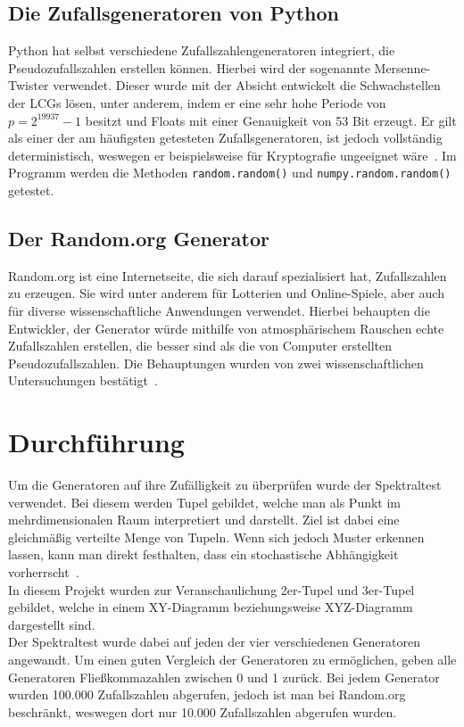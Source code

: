 \documentclass[12pt]{article}
\begin{document}
    \subsection{Die Zufallsgeneratoren von Python}\label{subsec:die-zufallsgeneratoren-von-python}
    Python hat selbst verschiedene Zufallszahlengeneratoren integriert, die Pseudozufallszahlen erstellen können.
    Hierbei wird der sogenannte Mersenne-Twister verwendet.
    Dieser wurde mit der Absicht entwickelt die Schwachstellen der LCGs lösen, unter anderem,
    indem er eine sehr hohe Periode von $p=2^{19937}-1$ besitzt und Floats mit einer Genauigkeit von 53 Bit erzeugt.
    Er gilt als einer der am häufigsten getesteten Zufallsgeneratoren, ist jedoch vollständig deterministisch,
    weswegen er beispielsweise für Kryptografie ungeeignet wäre~\cite{python-random,mersenne-twister}.
    Im Programm werden die Methoden \texttt{random.random()} und \texttt{numpy.random.random()} getestet.

    \vfill

    \subsection{Der Random.org Generator}\label{subsec:der-random.org-generator}
    Random.org ist eine Internetseite, die sich darauf spezialisiert hat, Zufallszahlen zu erzeugen.
    Sie wird unter anderem für Lotterien und Online-Spiele, aber auch für diverse wissenschaftliche
    Anwendungen verwendet.
    Hierbei behaupten die Entwickler, der Generator würde mithilfe von atmosphärischem Rauschen echte Zufallszahlen erstellen,
    die besser sind als die von Computer erstellten Pseudozufallszahlen.
    Die Behauptungen wurden von zwei wissenschaftlichen Untersuchungen bestätigt~\cite{random-org}.

    \vfill

    \section{Durchführung}\label{sec:Durchfuehrung}
    Um die Generatoren auf ihre Zufälligkeit zu überprüfen wurde der Spektraltest verwendet.
    Bei diesem werden Tupel gebildet, welche man als Punkt im mehrdimensionalen Raum interpretiert und darstellt.
    Ziel ist dabei eine gleichmäßig verteilte Menge von Tupeln.
    Wenn sich jedoch Muster erkennen lassen, kann man direkt festhalten, dass ein stochastische Abhängigkeit vorherrscht~\cite{spektraltest}.
    \\
    In diesem Projekt wurden zur Veranschaulichung 2er-Tupel und 3er-Tupel gebildet,
    welche in einem XY-Diagramm beziehungsweise XYZ-Diagramm dargestellt sind.
    \\
    Der Spektraltest wurde dabei auf jeden der vier verschiedenen Generatoren angewandt.
    Um einen guten Vergleich der Generatoren zu ermöglichen, geben alle Generatoren Fließkommazahlen zwischen 0 und 1 zurück.
    Bei jedem Generator wurden 100.000 Zufallszahlen abgerufen, jedoch ist man bei Random.org beschränkt,
    weswegen dort nur 10.000 Zufallszahlen abgerufen wurden.
\end{document}
